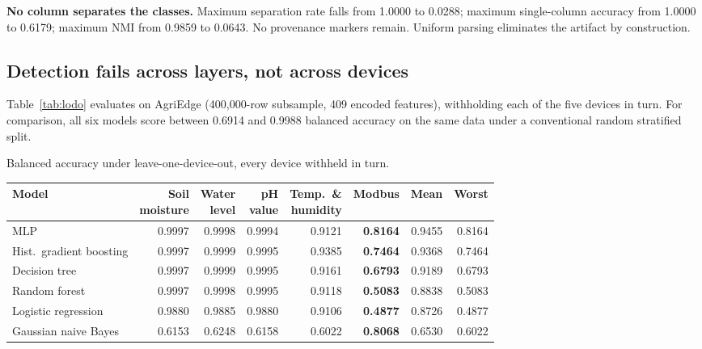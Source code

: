 \textbf{No column separates the classes.} Maximum separation rate falls from
1.0000 to 0.0288; maximum single-column accuracy from 1.0000 to 0.6179; maximum
NMI from 0.9859 to 0.0643. No provenance markers remain. Uniform parsing
eliminates the artifact by construction.

\subsection{Detection fails across layers, not across devices}
\label{sec:lodo}

Table~\ref{tab:lodo} evaluates on AgriEdge (400{,}000-row subsample, 409
encoded features), withholding each of the five devices in turn. For
comparison, all six models score between 0.6914 and 0.9988 balanced accuracy on
the same data under a conventional random stratified split.

\begin{wtable}
\centering
\footnotesize
\setlength{\tabcolsep}{3pt}
\caption{Balanced accuracy under leave-one-device-out, every device withheld in
turn.}
\label{tab:lodo}
\begin{fittable}
\begin{tabular}{lrrrrrrr}
\toprule
Model & \makecell{Soil\\moisture} & \makecell{Water\\level} & \makecell{pH\\value} &
\makecell{Temp.\ \&\\humidity} & \textbf{Modbus} & Mean & Worst \\
\midrule
MLP                      & 0.9997 & 0.9998 & 0.9994 & 0.9121 & \textbf{0.8164} & 0.9455 & 0.8164 \\
Hist.\ gradient boosting & 0.9997 & 0.9999 & 0.9995 & 0.9385 & \textbf{0.7464} & 0.9368 & 0.7464 \\
Decision tree            & 0.9997 & 0.9999 & 0.9995 & 0.9161 & \textbf{0.6793} & 0.9189 & 0.6793 \\
Random forest            & 0.9997 & 0.9998 & 0.9995 & 0.9118 & \textbf{0.5083} & 0.8838 & 0.5083 \\
Logistic regression      & 0.9880 & 0.9885 & 0.9880 & 0.9106 & \textbf{0.4877} & 0.8726 & 0.4877 \\
Gaussian naive Bayes     & 0.6153 & 0.6248 & 0.6158 & 0.6022 & \textbf{0.8068} & 0.6530 & 0.6022 \\
\bottomrule
\end{tabular}
\end{fittable}
\end{wtable}

